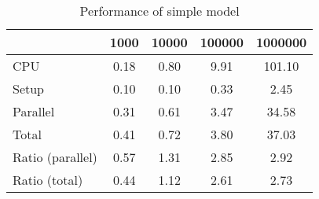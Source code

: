\begin{table}[!h]
\centering
\caption{Performance of simple model}
\begin{tabular}{l*{4}{c}}\hline
& 1000 &           10000 &          100000 &         1000000 \\ \hline
CPU &     0.18 &      0.80 &      9.91 &    101.10 \\
Setup &     0.10 &      0.10 &      0.33 &      2.45 \\
Parallel &     0.31 &      0.61 &      3.47 &     34.58 \\
Total &     0.41 &      0.72 &      3.80 &     37.03 \\
Ratio (parallel) &     0.57 &      1.31 &      2.85 &      2.92 \\
Ratio (total) &     0.44 &      1.12 &      2.61 &      2.73 \\
\hline
\end{tabular}
\end{table}
